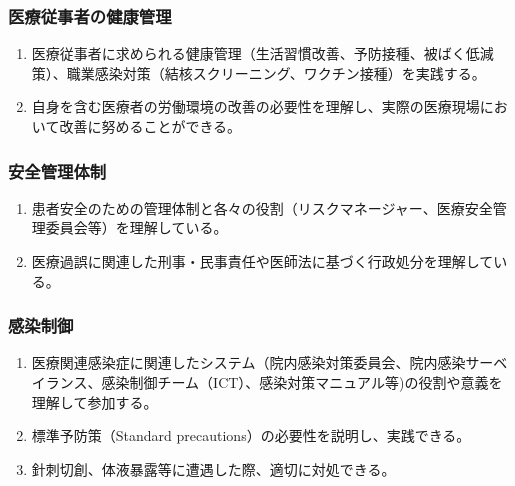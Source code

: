 \hypertarget{ux533bux7642ux5f93ux4e8bux8005ux306eux5065ux5eb7ux7ba1ux7406}{%
\subsubsection{医療従事者の健康管理}\label{ux533bux7642ux5f93ux4e8bux8005ux306eux5065ux5eb7ux7ba1ux7406}}

\begin{enumerate}
\def\labelenumi{\arabic{enumi}.}
\tightlist
\item
  医療従事者に求められる健康管理（生活習慣改善、予防接種、被ばく低減策）、職業感染対策（結核スクリーニング、ワクチン接種）を実践する。
\item
  自身を含む医療者の労働環境の改善の必要性を理解し、実際の医療現場において改善に努めることができる。
\end{enumerate}

\hypertarget{ux5b89ux5168ux7ba1ux7406ux4f53ux5236}{%
\subsubsection{安全管理体制}\label{ux5b89ux5168ux7ba1ux7406ux4f53ux5236}}

\begin{enumerate}
\def\labelenumi{\arabic{enumi}.}
\tightlist
\item
  患者安全のための管理体制と各々の役割（リスクマネージャー、医療安全管理委員会等）を理解している。
\item
  医療過誤に関連した刑事・民事責任や医師法に基づく行政処分を理解している。
\end{enumerate}

\hypertarget{ux611fux67d3ux5236ux5fa1}{%
\subsubsection{感染制御}\label{ux611fux67d3ux5236ux5fa1}}

\begin{enumerate}
\def\labelenumi{\arabic{enumi}.}
\tightlist
\item
  医療関連感染症に関連したシステム（院内感染対策委員会、院内感染サーベイランス、感染制御チーム（ICT）、感染対策マニュアル等)の役割や意義を理解して参加する。
\item
  標準予防策（Standard precautions）の必要性を説明し、実践できる。
\item
  針刺切創、体液暴露等に遭遇した際、適切に対処できる。
\end{enumerate}

